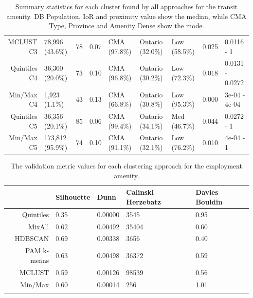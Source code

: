\documentclass[11pt, a4paper]{article}
\begin{document}
\begin{table}[H]
{\begin{tabular}{|r|llllllll|}
  MCLUST C3 & 78,996 (43.6\%) & 78 & 0.07 & CMA (97.8\%) & Ontario (32.0\%) & Low (58.5\%) & 0.025 & 0.0116 - 1 \\ 
  Quintiles C4 & 36,300 (20.0\%) & 73 & 0.10 & CMA (96.8\%) & Ontario (30.2\%) & Low (72.3\%) & 0.018 & 0.0131 - 0.0272 \\ 
  Min/Max C4 & 1,923 (1.1\%) & 43 & 0.13 & CMA (66.8\%) & Ontario (30.8\%) & Low (95.3\%) & 0.000 & 3e-04 - 4e-04 \\ 
  Quintiles C5 & 36,356 (20.1\%) & 85 & 0.06 & CMA (99.4\%) & Ontario (34.1\%) & Med (46.7\%) & 0.044 & 0.0272 - 1 \\ 
  Min/Max C5 & 173,812 (95.9\%) & 74 & 0.10 & CMA (91.1\%) & Ontario (32.1\%) & Low (76.2\%) & 0.010 & 4e-04 - 1 \\ 
   \hline
\end{tabular}
}
\caption[Transit cluster profiles]{Summary statistics for each cluster found by all approaches for the transit amenity. DB Population, IoR and proximity value show the median, while CMA Type, Province and Amenity Dense show the mode.}\label{transitprofiles}
\end{table}










\centering
\begin{longtable}[H]{|r|llll|}
  \hline
 & Silhouette & Dunn & Calinski Herzebatz & Davies Bouldin \\ 
  \hline
Quintiles & 0.35 & 0.00000 &  3545 & 0.95 \\ 
   \hline
MixAll & 0.62 & 0.00492 & 35404 & 0.60 \\ 
   \hline
HDBSCAN & 0.69 & 0.00338 &  3656 & 0.40 \\ 
   \hline
PAM k-means & 0.63 & 0.00498 & 36372 & 0.59 \\ 
   \hline
MCLUST & 0.59 & 0.00126 & 98539 & 0.56 \\ 
   \hline
Min/Max & 0.60 & 0.00014 &   256 & 1.01 \\ 
   \hline
\caption[Employment validation metrics]{The validation metric values for each clustering approach for the employment amenity.}\label{employmentvalid}
\end{longtable}
\end{document}
